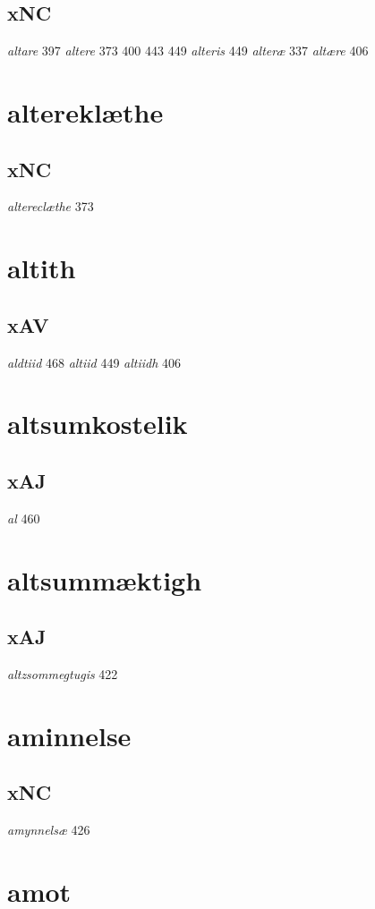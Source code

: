 \documentclass[a4paper,twocolumn]{article}
\begin{document}
\subsection{xNC}
\label{sec:org394c890}
\emph{altare} 397 \emph{altere} 373 400 443 449 \emph{alteris} 449 \emph{alteræ} 337 \emph{altære} 406 
\section{altereklæthe}
\label{sec:orgf8c0be5}
\subsection{xNC}
\label{sec:org0ef22fb}
\emph{altereclæthe} 373 
\section{altith}
\label{sec:org7f58b6b}
\subsection{xAV}
\label{sec:org6fda2ec}
\emph{aldtiid} 468 \emph{altiid} 449 \emph{altiidh} 406 
\section{altsumkostelik}
\label{sec:orgb65e0ba}
\subsection{xAJ}
\label{sec:org02b6eba}
\emph{al} 460 
\section{altsummæktigh}
\label{sec:orgdaa254f}
\subsection{xAJ}
\label{sec:orgf6bf64f}
\emph{altzsommegtugis} 422 
\section{aminnelse}
\label{sec:org39200a5}
\subsection{xNC}
\label{sec:orgbf0b546}
\emph{amynnelsæ} 426 
\section{amot}
\label{sec:orgeea991a}
\end{document}
